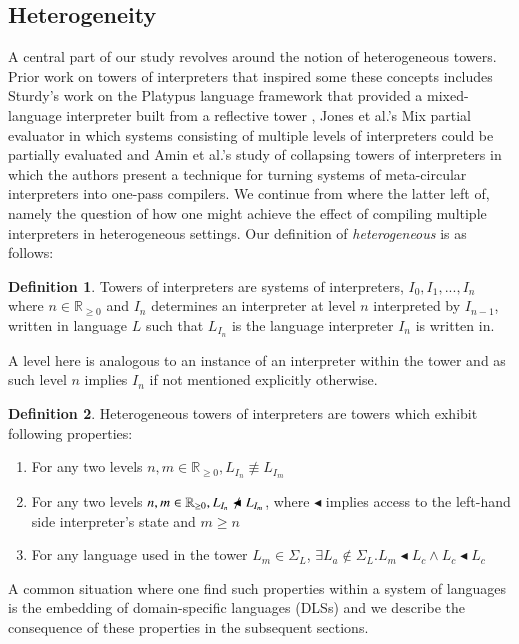 \documentclass[fleqn]{article}
\theoremstyle{definition}
\newtheorem{definition}{Definition}[section]
\begin{document}
\subsection{Heterogeneity}
A central part of our study revolves around the notion of heterogeneous towers. Prior work on towers of interpreters that inspired some these concepts includes Sturdy's work on the Platypus language framework that provided a mixed-language interpreter built from a reflective tower \cite{sturdy1993lisp}, Jones et al.'s Mix partial evaluator \cite{jones1989mix} in which systems consisting of multiple levels of interpreters could be partially evaluated and Amin et al.'s study of collapsing towers of interpreters in which the authors present a technique for turning systems of meta-circular interpreters into one-pass compilers. We continue from where the latter left of, namely the question of how one might achieve the effect of compiling multiple interpreters in heterogeneous settings. Our definition of \textit{heterogeneous} is as follows:
\theoremstyle{definition}
\begin{definition}
	Towers of interpreters are systems of interpreters, $I_0, I_1, ..., I_n$ where $n \in \mathbb R_{\ge 0}$ and $I_n$ determines an interpreter at level $n$ interpreted by $I_{n-1}$, written in language $L$ such that $L_{I_n}$ is the language interpreter $I_n$ is written in.
\end{definition}

A level here is analogous to an instance of an interpreter within the tower and as such level $n$ implies $I_n$ if not mentioned explicitly otherwise.

\begin{definition}
	Heterogeneous towers of interpreters are towers which exhibit following properties:
	\begin{enumerate}
		\item For any two levels $n, m \in \mathbb R_{\ge 0}, L_{I_n} \not\equiv L_{I_m}$
		\item For any two levels $n, m \in \mathbb R_{\ge 0}, L_{I_n} \not\blacktriangleleft L_{I_m}$, where $\blacktriangleleft$ implies access to the left-hand side interpreter's state and $m \ge n$
		\item For any language used in the tower $L_m \in \Sigma_L$, $\exists L_a \not\in \Sigma_L.L_m \blacktriangleleft L_c \land L_c \blacktriangleleft L_c$
	\end{enumerate}
\end{definition}\label{def:het}
A common situation where one find such properties within a system of languages is the embedding of domain-specific languages (DLSs) and we describe the consequence of these properties in the subsequent sections.
\end{document}
